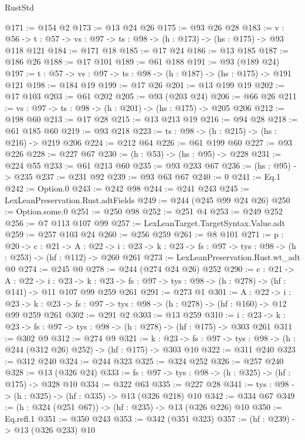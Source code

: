 \begin{lexlean}{RustStd}
\begin{coremodule}
@171 := @154 @2
@173 := @13 @24 @26
@175 := @93 @26 @28
@183 := {v : @56} ->
  {t : @57} -> {vs : @97} -> {ts : @98} -> (h : @173) -> (hs : @175) -> @93 @118 @121
@184 := @171 @18
@185 := @17 @24
@186 := @13 @185
@187 := @186 @26
@188 := @17 @101
@189 := @61 @188
@191 := @93 (@189 @24)
@197 := {t : @57} -> {vs : @97} -> {ts : @98} -> (h : @187) -> (hs : @175) -> @191 @121
@198 := @184 @19
@199 := @17 @26
@201 := @13 @199 @19
@202 := @17 @103
@203 := @61 @202
@205 := @93 (@203 @24)
@206 := @66 @26
@211 := {vs : @97} -> {ts : @98} -> (h : @201) -> (hs : @175) -> @205 @206
@212 := @198 @60
@213 := @17 @28
@215 := @13 @213 @19
@216 := @94 @28
@218 := @61 @185 @60
@219 := @93 @218
@223 := {ts : @98} -> (h : @215) -> (hs : @216) -> @219 @206
@224 := @212 @64
@226 := @61 @199 @60
@227 := @93 @226
@228 := @227 @67
@230 := (h : @53) -> (hs : @95) -> @228
@231 := @224 @55
@233 := @61 @213 @60
@235 := @93 @233 @67
@236 := (hs : @95) -> @235
@237 := @231 @92
@239 := @93 @63 @67
@240 := 0
@241 := Eq.{1}
@242 := Option.{0}
@243 := @242 @98
@244 := @241 @243
@245 := LexLeanPreservation.Rust.adtFields
@249 := @244 (@245 @99 @24 @26)
@250 := Option.some.{0}
@251 := @250 @98
@252 := @251 @4
@253 := @249 @252
@256 := @7 @113 @107 @99
@257 := LexLeanTarget.TargetSyntax.Value.adt
@259 := @257 @103 @24
@260 := @256 @259
@261 := @8 @101
@271 := {p : @20} ->
  {c : @21} ->
  {A : @22} ->
  {i : @23} -> {k : @23} -> {fs : @97} -> {tys : @98} -> (h : @253) -> (hf : @112) -> @260 @261
@273 := LexLeanPreservation.Rust.wt_adt @0
@274 := @245 @0
@278 := @244 (@274 @24 @26) @252
@290 := {c : @21} ->
  {A : @22} ->
  {i : @23} ->
  {k : @23} -> {fs : @97} -> {tys : @98} -> (h : @278) -> (hf : @141) -> @11 @107 @99 @259 @261
@291 := @273 @1
@301 := {A : @22} ->
  {i : @23} ->
  {k : @23} -> {fs : @97} -> {tys : @98} -> (h : @278) -> (hf : @160) -> @12 @99 @259 @261
@302 := @291 @2
@303 := @13 @259
@310 := {i : @23} ->
  {k : @23} -> {fs : @97} -> {tys : @98} -> (h : @278) -> (hf : @175) -> @303 @261
@311 := @302 @9
@312 := @274 @9
@321 := {k : @23} ->
  {fs : @97} -> {tys : @98} -> (h : @244 (@312 @26) @252) -> (hf : @175) -> @303 @10
@322 := @311 @240
@323 := @312 @240
@324 := @244 @323
@325 := @324 @252
@326 := @257 @240
@328 := @13 (@326 @24)
@333 := {fs : @97} -> {tys : @98} -> (h : @325) -> (hf : @175) -> @328 @10
@334 := @322 @63
@335 := @227 @28
@341 := {tys : @98} -> (h : @325) -> (hf : @335) -> @13 (@326 @218) @10
@342 := @334 @67
@349 := (h : @324 (@251 @67)) -> (hf : @235) -> @13 (@326 @226) @10
@350 := Eq.refl.{1}
@351 := @350 @243
@353 := @342 (@351 @323)
@357 := (hf : @239) -> @13 (@326 @233) @10

\end{coremodule}
\end{lexlean}
